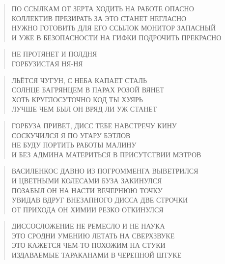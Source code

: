 \poemtitle{***}
\begin{verse}
ПО ССЫЛКАМ ОТ ЗЕРТА ХОДИТЬ НА РАБОТЕ ОПАСНО\\
КОЛЛЕКТИВ ПРЕЗИРАТЬ ЗА ЭТО СТАНЕТ НЕГЛАСНО\\
НУЖНО ГОТОВИТЬ ДЛЯ ЕГО ССЫЛОК МОНИТОР ЗАПАСНЫЙ\\
И УЖЕ В БЕЗОПАСНОСТИ НА ГИФКИ ПОДРОЧИТЬ ПРЕКРАСНО
\end{verse}

\poemtitle{***}
\begin{verse}
НЕ ПРОТЯНЕТ И ПОЛДНЯ\\
ГОРБУЗИСТАЯ НЯ-НЯ
\end{verse}

\poemtitle{***}
\begin{verse}
ЛЬЁТСЯ ЧУГУН, С НЕБА КАПАЕТ СТАЛЬ\\
СОЛНЦЕ БАГРЯНЦЕМ В ПАРАХ РОЗОЙ ВЯНЕТ\\
ХОТЬ КРУГЛОСУТОЧНО КОД ТЫ ХУЯРЬ\\
ЛУЧШЕ ЧЕМ БЫЛ ОН ВРЯД ЛИ УЖ СТАНЕТ
\end{verse}

\poemtitle{***}
\begin{verse}
ГОРБУЗА ПРИВЕТ, ДИСС ТЕБЕ НАВСТРЕЧУ КИНУ\\
СОСКУЧИЛСЯ Я ПО УГАРУ БЭТЛОВ\\
НЕ БУДУ ПОРТИТЬ РАБОТЫ МАЛИНУ\\
И БЕЗ АДМИНА МАТЕРИТЬСЯ В ПРИСУТСТВИИ МЭТРОВ
\end{verse}

\poemtitle{***}
\begin{verse}
ВАСИЛЕНКОС ДАВНО ИЗ ПОГРОММЕНГА ВЫВЕТРИЛСЯ\\
И ЦВЕТНЫМИ КОЛЕСАМИ БУЗА ЗАКИНУЛСЯ\\
ПОЗАБЫЛ ОН НА НАСТИ ВЕЧЕРНЮЮ ТОЧКУ\\
УВИДАВ ВДРУГ ВНЕЗАПНОГО ДИССА ДВЕ СТРОЧКИ\\
ОТ ПРИХОДА ОН ХИМИИ РЕЗКО ОТКИНУЛСЯ
\end{verse}

\poemtitle{***}
\begin{verse}
ДИССОСЛОЖЕНИЕ НЕ РЕМЕСЛО И НЕ НАУКА\\
ЭТО СРОДНИ УМЕНИЮ ЛЕТАТЬ НА СВЕРХЗВУКЕ\\
ЭТО КАЖЕТСЯ ЧЕМ-ТО ПОХОЖИМ НА СТУКИ\\
ИЗДАВАЕМЫЕ ТАРАКАНАМИ В ЧЕРЕПНОЙ ШТУКЕ
\end{verse}

